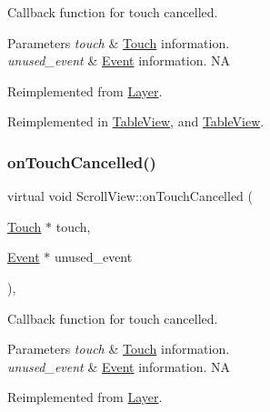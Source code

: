 Callback function for touch cancelled.


\begin{DoxyParams}{Parameters}
{\em touch} & \hyperlink{classTouch}{Touch} information. \\
\hline
{\em unused\+\_\+event} & \hyperlink{classEvent}{Event} information.  NA \\
\hline
\end{DoxyParams}


Reimplemented from \hyperlink{classLayer_a9254f82e75c109b81c392d415ecf7b3d}{Layer}.



Reimplemented in \hyperlink{classTableView_a5ed81baf58526698abefaf8ca08a6c01}{Table\+View}, and \hyperlink{classTableView_a743113e92ef98837c4cfdacf40fd0a0f}{Table\+View}.

\mbox{\label{classScrollView_a911e0e123c9f120f654744626bfcfd2c}} 
\subsubsection{\texorpdfstring{on\+Touch\+Cancelled()}{onTouchCancelled()}\hspace{0.1cm}{\footnotesize\ttfamily [2/2]}}
{\footnotesize\ttfamily virtual void Scroll\+View\+::on\+Touch\+Cancelled (\begin{DoxyParamCaption}\item[{\hyperlink{classTouch}{Touch} $\ast$}]{touch,  }\item[{\hyperlink{classEvent}{Event} $\ast$}]{unused\+\_\+event }\end{DoxyParamCaption})\hspace{0.3cm}{\ttfamily [override]}, {\ttfamily [virtual]}}

Callback function for touch cancelled.


\begin{DoxyParams}{Parameters}
{\em touch} & \hyperlink{classTouch}{Touch} information. \\
\hline
{\em unused\+\_\+event} & \hyperlink{classEvent}{Event} information.  NA \\
\hline
\end{DoxyParams}


Reimplemented from \hyperlink{classLayer_a9254f82e75c109b81c392d415ecf7b3d}{Layer}.



